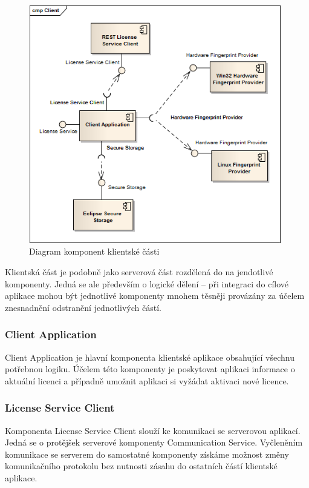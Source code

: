 \begin{figure}[tbh]
\begin{center}
\includegraphics[width=11cm]{figures/components-client.png}
\caption{Diagram komponent klientské části}
\label{fig:components-client} 
\end{center}
\end{figure}

Klientská část je podobně jako serverová část rozdělená do na jendotlivé
komponenty. Jedná se ale především o logické dělení – při integraci do cílové
aplikace mohou být jednotlivé komponenty mnohem těsněji provázány za účelem
znesnadnění odstranění jednotlivých částí.

\subsubsection*{Client Application}

Client Application je hlavní komponenta klientské aplikace obsahující všechnu
potřebnou logiku. Účelem této komponenty je poskytovat aplikaci informace o
aktuální licenci a případně umožnit aplikaci si vyžádat aktivaci nové licence.

\subsubsection*{License Service Client}
\label{subsec:license-service-client}

Komponenta License Service Client slouží ke komunikaci se serverovou aplikací.
Jedná se o protějšek serverové komponenty Communication Service. Vyčleněním
komunikace se serverem do samostatné komponenty získáme možnost změny
komunikačního protokolu bez nutnosti zásahu do ostatních částí klientské
aplikace.

